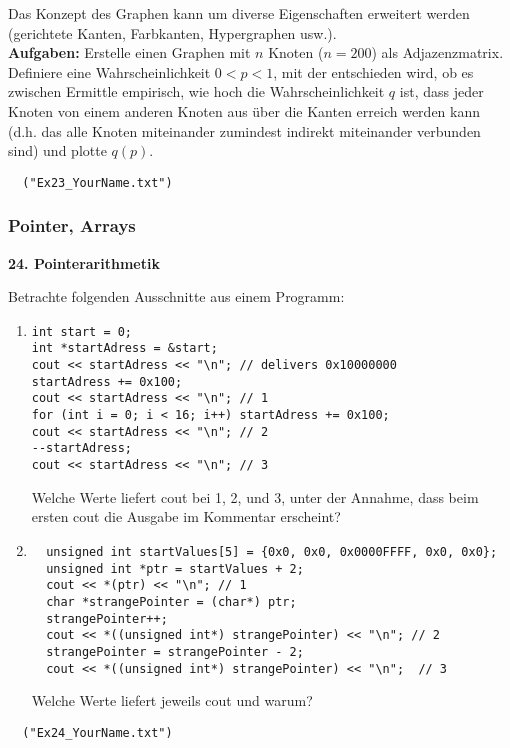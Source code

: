\documentclass[paper=A4, pagesize, DIV=calc, smallheadings,
fontsize=11pt, expansion=false]{scrreprt}
\begin{document}
Das Konzept des Graphen kann um diverse Eigenschaften erweitert werden (gerichtete Kanten, Farbkanten, Hypergraphen usw.).\\
\textbf{Aufgaben:} 
Erstelle einen Graphen mit $n$ Knoten ($n = 200$) als Adjazenzmatrix. 
Definiere eine Wahrscheinlichkeit $0 < p < 1$, mit der entschieden wird, ob es zwischen 
Ermittle empirisch, wie hoch die Wahrscheinlichkeit $q$ ist, dass jeder Knoten von einem anderen Knoten aus über die Kanten erreich werden kann (d.h. das alle Knoten miteinander zumindest indirekt miteinander verbunden sind) und plotte $q(p)$.

\begin{verbatim}
  ("Ex23_YourName.txt")
\end{verbatim} 

\subsubsection{Pointer, Arrays}

\textbf{24. Pointerarithmetik}

Betrachte folgenden Ausschnitte aus einem Programm:
    \begin{enumerate}
     \item
\begin{verbatim}
int start = 0;
int *startAdress = &start;
cout << startAdress << "\n"; // delivers 0x10000000
startAdress += 0x100;
cout << startAdress << "\n"; // 1
for (int i = 0; i < 16; i++) startAdress += 0x100;
cout << startAdress << "\n"; // 2
--startAdress;
cout << startAdress << "\n"; // 3
\end{verbatim}
    Welche Werte liefert cout bei 1, 2, und 3, unter der Annahme, dass beim ersten cout die Ausgabe im Kommentar erscheint?
  \item
\begin{verbatim}
  unsigned int startValues[5] = {0x0, 0x0, 0x0000FFFF, 0x0, 0x0};
  unsigned int *ptr = startValues + 2;
  cout << *(ptr) << "\n"; // 1
  char *strangePointer = (char*) ptr;  
  strangePointer++; 
  cout << *((unsigned int*) strangePointer) << "\n"; // 2
  strangePointer = strangePointer - 2;
  cout << *((unsigned int*) strangePointer) << "\n";  // 3
\end{verbatim}
    Welche Werte liefert jeweils cout und warum?
  \end{enumerate}
\begin{verbatim}
  ("Ex24_YourName.txt")
\end{verbatim}  
\end{document}
